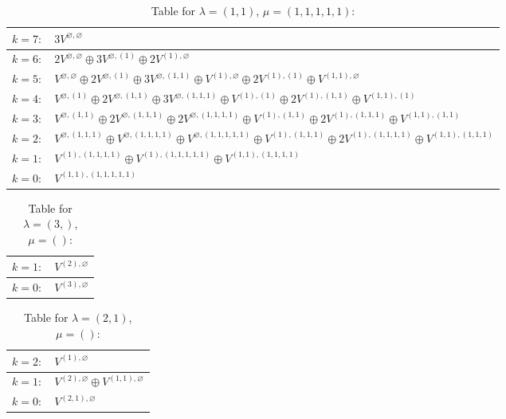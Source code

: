 \documentclass[a4paper,12pt]{article}
\begin{document}
\renewcommand{\arraystretch}{1.6} 
\begin{table}[H]
\centering
\caption{Table for $\lambda = (1, 1)$, $\mu = (1, 1, 1, 1, 1)$:}
\begin{tabular}{|>{\centering\arraybackslash}p{15cm}|}
\hline
 $k = 7: \quad 3 V^{\varnothing, \varnothing} $ \\ \hline
 $k = 6: \quad 2 V^{\varnothing, \varnothing} \oplus 3 V^{\varnothing, (1)} \oplus 2 V^{(1), \varnothing} $ \\ \hline
 $k = 5: \quad V^{\varnothing, \varnothing} \oplus 2 V^{\varnothing, (1)} \oplus 3 V^{\varnothing, (1, 1)} \oplus V^{(1), \varnothing} \oplus 2 V^{(1), (1)} \oplus V^{(1, 1), \varnothing} $ \\ \hline
 $k = 4: \quad V^{\varnothing, (1)} \oplus 2 V^{\varnothing, (1, 1)} \oplus 3 V^{\varnothing, (1, 1, 1)} \oplus V^{(1), (1)} \oplus 2 V^{(1), (1, 1)} \oplus V^{(1, 1), (1)} $ \\ \hline
 $k = 3: \quad V^{\varnothing, (1, 1)} \oplus 2 V^{\varnothing, (1, 1, 1)} \oplus 2 V^{\varnothing, (1, 1, 1, 1)} \oplus V^{(1), (1, 1)} \oplus 2 V^{(1), (1, 1, 1)} \oplus V^{(1, 1), (1, 1)} $ \\ \hline
 $k = 2: \quad V^{\varnothing, (1, 1, 1)} \oplus V^{\varnothing, (1, 1, 1, 1)} \oplus V^{\varnothing, (1, 1, 1, 1, 1)} \oplus V^{(1), (1, 1, 1)} \oplus 2 V^{(1), (1, 1, 1, 1)} \oplus V^{(1, 1), (1, 1, 1)} $ \\ \hline
 $k = 1: \quad V^{(1), (1, 1, 1, 1)} \oplus V^{(1), (1, 1, 1, 1, 1)} \oplus V^{(1, 1), (1, 1, 1, 1)} $ \\ \hline
 $k = 0: \quad V^{(1, 1), (1, 1, 1, 1, 1)} $ \\ \hline
\end{tabular}
\end{table}

\renewcommand{\arraystretch}{1.6} 
\begin{table}[H]
\centering
\caption{Table for $\lambda = (3,)$, $\mu = ()$:}
\begin{tabular}{|>{\centering\arraybackslash}p{15cm}|}
\hline
 $k = 1: \quad V^{(2), \varnothing} $ \\ \hline
 $k = 0: \quad V^{(3), \varnothing} $ \\ \hline
\end{tabular}
\end{table}

\renewcommand{\arraystretch}{1.6} 
\begin{table}[H]
\centering
\caption{Table for $\lambda = (2, 1)$, $\mu = ()$:}
\begin{tabular}{|>{\centering\arraybackslash}p{15cm}|}
\hline
 $k = 2: \quad V^{(1), \varnothing} $ \\ \hline
 $k = 1: \quad V^{(2), \varnothing} \oplus V^{(1, 1), \varnothing} $ \\ \hline
 $k = 0: \quad V^{(2, 1), \varnothing} $ \\ \hline
\end{tabular}
\end{table}
\end{document}
